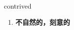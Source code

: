 
\begin{frame}
{\huge contrived}
\begin{center}
\begin{enumerate}\Large
  \item \textbf{不自然的，刻意的}
\end{enumerate}
\end{center}
\end{frame}
